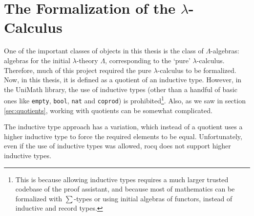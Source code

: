 \section{The Formalization of the \texorpdfstring{$ \lambda $}{lambda}-Calculus} \label{sec:axiomatic-lambda-calculus}
One of the important classes of objects in this thesis is the class of $ \Lambda $-algebras: algebras for the initial $ \lambda $-theory $ \Lambda $, corresponding to the `pure' $ \lambda $-calculus. Therefore, much of this project required the pure $ \lambda $-calculus to be formalized. Now, in this thesis, it is defined as a quotient of an inductive type. However, in the UniMath library, the use of inductive types (other than a handful of basic ones like \texttt{empty}, \texttt{bool}, \texttt{nat} and \texttt{coprod}) is prohibited\footnote{This is because allowing inductive types requires a much larger trusted codebase of the proof assistant, and because most of mathematics can be formalized with $ \sum $-types or using initial algebras of functors, instead of inductive and record types.}. Also, as we saw in section \ref{sec:quotients}, working with quotients can be somewhat complicated.

The inductive type approach has a variation, which instead of a quotient uses a higher inductive type to force the required elements to be equal. Unfortunately, even if the use of inductive types was allowed, rocq does not support higher inductive types.

